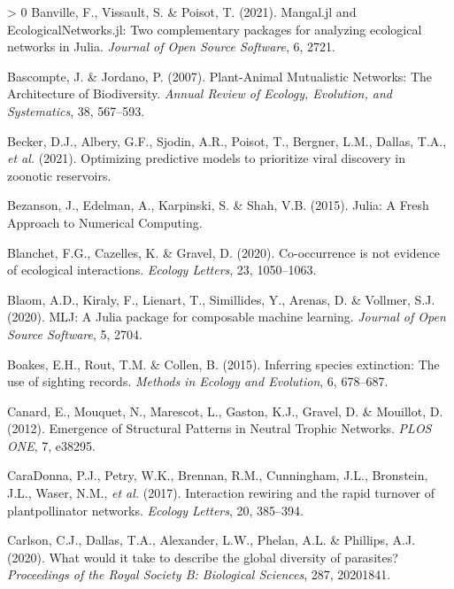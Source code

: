 \documentclass[10pt,oneside]{article}
\newlength{\cslhangindent}
\newenvironment{CSLReferences}[3] %
 {%
  \setlength{\parindent}{0pt}
  \ifodd #1 \everypar{\setlength{\hangindent}{\cslhangindent}}\ignorespaces\fi
  \ifnum #2 > 0
  \setlength{\parskip}{#2\baselineskip}
  \fi
 }%
 {}
\begin{document}
\hypertarget{refs}{}
\begin{CSLReferences}{1}{0}
\leavevmode\hypertarget{ref-Banville2021ManJl}{}%
Banville, F., Vissault, S. \& Poisot, T. (2021). Mangal.jl and
EcologicalNetworks.jl: Two complementary packages for analyzing
ecological networks in Julia. \emph{Journal of Open Source Software}, 6,
2721.

\leavevmode\hypertarget{ref-Bascompte2007PlaMut}{}%
Bascompte, J. \& Jordano, P. (2007). Plant-Animal Mutualistic Networks:
The Architecture of Biodiversity. \emph{Annual Review of Ecology,
Evolution, and Systematics}, 38, 567--593.

\leavevmode\hypertarget{ref-Becker2021OptPre}{}%
Becker, D.J., Albery, G.F., Sjodin, A.R., Poisot, T., Bergner, L.M.,
Dallas, T.A., \emph{et al.} (2021). Optimizing predictive models to
prioritize viral discovery in zoonotic reservoirs.

\leavevmode\hypertarget{ref-Bezanson2015JulFre}{}%
Bezanson, J., Edelman, A., Karpinski, S. \& Shah, V.B. (2015). Julia: A
Fresh Approach to Numerical Computing.

\leavevmode\hypertarget{ref-Blanchet2020CooNot}{}%
Blanchet, F.G., Cazelles, K. \& Gravel, D. (2020). Co-occurrence is not
evidence of ecological interactions. \emph{Ecology Letters}, 23,
1050--1063.

\leavevmode\hypertarget{ref-Blaom2020MljJul}{}%
Blaom, A.D., Kiraly, F., Lienart, T., Simillides, Y., Arenas, D. \&
Vollmer, S.J. (2020). MLJ: A Julia package for composable machine
learning. \emph{Journal of Open Source Software}, 5, 2704.

\leavevmode\hypertarget{ref-Boakes2015InfSpe}{}%
Boakes, E.H., Rout, T.M. \& Collen, B. (2015). Inferring species
extinction: The use of sighting records. \emph{Methods in Ecology and
Evolution}, 6, 678--687.

\leavevmode\hypertarget{ref-Canard2012EmeStr}{}%
Canard, E., Mouquet, N., Marescot, L., Gaston, K.J., Gravel, D. \&
Mouillot, D. (2012). Emergence of Structural Patterns in Neutral Trophic
Networks. \emph{PLOS ONE}, 7, e38295.

\leavevmode\hypertarget{ref-CaraDonna2017IntRew}{}%
CaraDonna, P.J., Petry, W.K., Brennan, R.M., Cunningham, J.L.,
Bronstein, J.L., Waser, N.M., \emph{et al.} (2017). Interaction rewiring
and the rapid turnover of plantpollinator networks. \emph{Ecology
Letters}, 20, 385--394.

\leavevmode\hypertarget{ref-Carlson2020WhaWou}{}%
Carlson, C.J., Dallas, T.A., Alexander, L.W., Phelan, A.L. \& Phillips,
A.J. (2020). What would it take to describe the global diversity of
parasites? \emph{Proceedings of the Royal Society B: Biological
Sciences}, 287, 20201841.


\end{CSLReferences}
\end{document}
